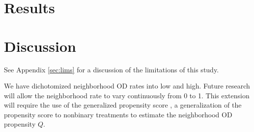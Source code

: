 \documentclass[12pt,a4paper,titlepage]{article}
\begin{document}
\section{Results}

\section{Discussion}
See Appendix \ref{sec:lims} for a discussion of the limitations of this study.

We have dichotomized neighborhood OD rates into low and high. Future research will allow the neighborhood rate to vary continuously from 0 to 1. This extension will require the use of the generalized propensity score \citep{hirano_imbens}, a generalization of the propensity score to nonbinary treatments to estimate the neighborhood OD propensity $Q$.



\end{document}
